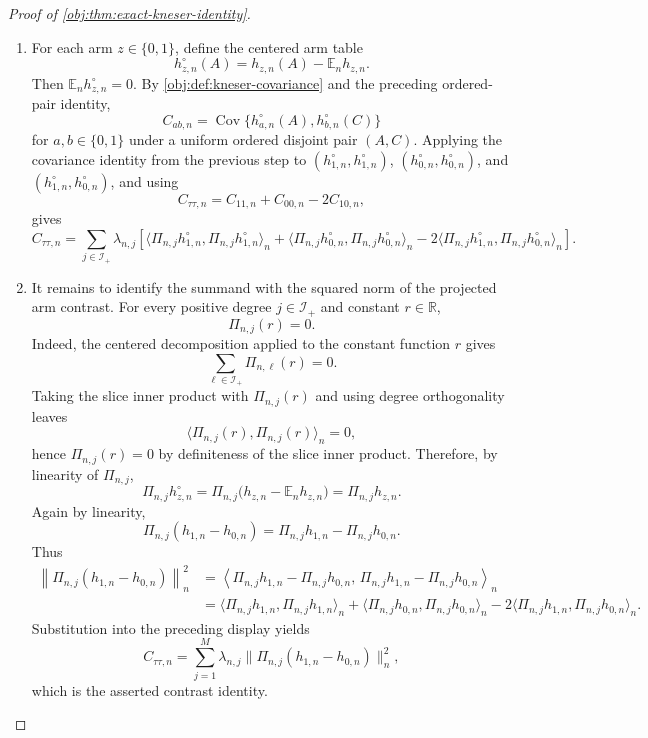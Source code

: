 \documentclass[11pt]{article}
\begin{document}
\begin{proof}[Proof of \cref{obj:thm:exact-kneser-identity}]
\begin{enumerate}
\item For each arm \(z\in\{0,1\}\), define the centered arm table
\[
h_{z,n}^{\circ}(A)=h_{z,n}(A)-\mathbb E_n h_{z,n}.
\]
Then \(\mathbb E_n h_{z,n}^{\circ}=0\).  By \cref{obj:def:kneser-covariance} and the preceding ordered-pair identity,
\[
C_{ab,n}
=
\operatorname{Cov}\{h_{a,n}^{\circ}(A),h_{b,n}^{\circ}(C)\}
\]
for \(a,b\in\{0,1\}\) under a uniform ordered disjoint pair \((A,C)\).  Applying the covariance identity from the previous step to \((h_{1,n}^{\circ},h_{1,n}^{\circ})\), \((h_{0,n}^{\circ},h_{0,n}^{\circ})\), and \((h_{1,n}^{\circ},h_{0,n}^{\circ})\), and using
\[
C_{\tau\tau,n}=C_{11,n}+C_{00,n}-2C_{10,n},
\]
gives
\[
C_{\tau\tau,n}
=
\sum_{j\in\mathcal I_+}\lambda_{n,j}
\left[
\langle \Pi_{n,j}h_{1,n}^{\circ},\Pi_{n,j}h_{1,n}^{\circ}\rangle_n
+
\langle \Pi_{n,j}h_{0,n}^{\circ},\Pi_{n,j}h_{0,n}^{\circ}\rangle_n
-
2\langle \Pi_{n,j}h_{1,n}^{\circ},\Pi_{n,j}h_{0,n}^{\circ}\rangle_n
\right].
\]

\item It remains to identify the summand with the squared norm of the projected arm contrast.  For every positive degree \(j\in\mathcal I_+\) and constant \(r\in\mathbb R\),
\[
\Pi_{n,j}(r)=0.
\]
Indeed, the centered decomposition applied to the constant function \(r\) gives
\[
\sum_{\ell\in\mathcal I_+}\Pi_{n,\ell}(r)=0.
\]
Taking the slice inner product with \(\Pi_{n,j}(r)\) and using degree orthogonality leaves
\[
\langle \Pi_{n,j}(r),\Pi_{n,j}(r)\rangle_n=0,
\]
hence \(\Pi_{n,j}(r)=0\) by definiteness of the slice inner product.  Therefore, by linearity of \(\Pi_{n,j}\),
\[
\Pi_{n,j}h_{z,n}^{\circ}
=
\Pi_{n,j}\bigl(h_{z,n}-\mathbb E_n h_{z,n}\bigr)
=
\Pi_{n,j}h_{z,n}.
\]
Again by linearity,
\[
\Pi_{n,j}(h_{1,n}-h_{0,n})
=
\Pi_{n,j}h_{1,n}-\Pi_{n,j}h_{0,n}.
\]
Thus
\[
\begin{aligned}
\left\|\Pi_{n,j}(h_{1,n}-h_{0,n})\right\|_n^2
&=
\left\langle
\Pi_{n,j}h_{1,n}-\Pi_{n,j}h_{0,n},\,
\Pi_{n,j}h_{1,n}-\Pi_{n,j}h_{0,n}
\right\rangle_n  \\
&=
\langle \Pi_{n,j}h_{1,n},\Pi_{n,j}h_{1,n}\rangle_n
+
\langle \Pi_{n,j}h_{0,n},\Pi_{n,j}h_{0,n}\rangle_n
-
2\langle \Pi_{n,j}h_{1,n},\Pi_{n,j}h_{0,n}\rangle_n .
\end{aligned}
\]
Substitution into the preceding display yields
\[
C_{\tau\tau,n}
=
\sum_{j=1}^{M}\lambda_{n,j}
\bigl\|\Pi_{n,j}(h_{1,n}-h_{0,n})\bigr\|_n^2,
\]
which is the asserted contrast identity.
\end{enumerate}
\end{proof}
\end{document}
